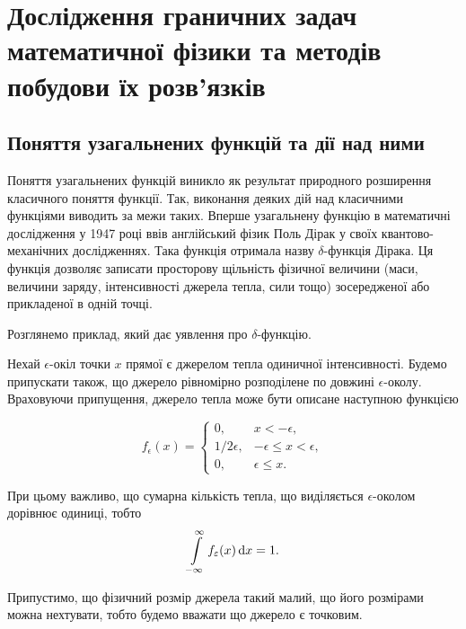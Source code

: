 \section{Дослідження граничних задач математичної фізики та методів побудови їх розв'язків}

\subsection{Поняття узагальнених функцій та дії над ними}

Поняття узагальнених функцій виникло як результат природного розширення класичного поняття функції. Так, виконання деяких дій над класичними функціями виводить за межи таких. Вперше узагальнену функцію в математичні дослідження у 1947 році ввів англійський фізик Поль Дірак у своїх квантово-механічних дослідженнях. Така функція отримала назву $\delta$-функція Дірака. Ця функція дозволяє записати просторову щільність фізичної величини (маси, величини заряду, інтенсивності джерела тепла, сили тощо) зосередженої або прикладеної в одній точці. \medskip

Розглянемо приклад, який дає уявлення про $\delta$-функцію. 
\begin{example}
	Нехай $\epsilon$-окіл точки $x$ прямої є джерелом тепла одиничної інтенсивності. Будемо припускати також, що джерело рівномірно розподілене по довжині $\epsilon$-околу. Враховуючи припущення, джерело тепла може бути описане наступною функцією

	\begin{equation}
		f_\epsilon(x) = \begin{cases} 
			0, & x < - \epsilon, \\
			1 / 2 \epsilon, & - \epsilon \le x < \epsilon, \\
			0, & \epsilon \le x.
		\end{cases}
	\end{equation}
\end{example}

\begin{remark}
	При цьому важливо, що сумарна кількість тепла, що виділяється $\epsilon$-околом дорівнює одиниці, тобто
	\begin{equation}
		\displaystyle\int\limits_{-\infty}^\infty f_\varepsilon(x) \mathop{}\!\mathrm{d} x = 1.
	\end{equation}
\end{remark}
Припустимо, що фізичний розмір джерела такий малий, що його розмірами можна нехтувати, тобто будемо вважати що джерело є точковим. \medskip

